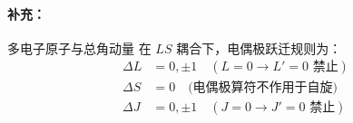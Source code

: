 \paragraph{补充：}多电子原子与总角动量
在 $LS$ 耦合下，电偶极跃迁规则为：
\begin{align*}
	\Delta L &= 0, \pm 1 \quad (L=0 \to L'=0 \text{ 禁止}) \\
	\Delta S &= 0 \quad \text{(电偶极算符不作用于自旋)} \\
	\Delta J &= 0, \pm 1 \quad (J=0 \to J'=0 \text{ 禁止})
\end{align*}